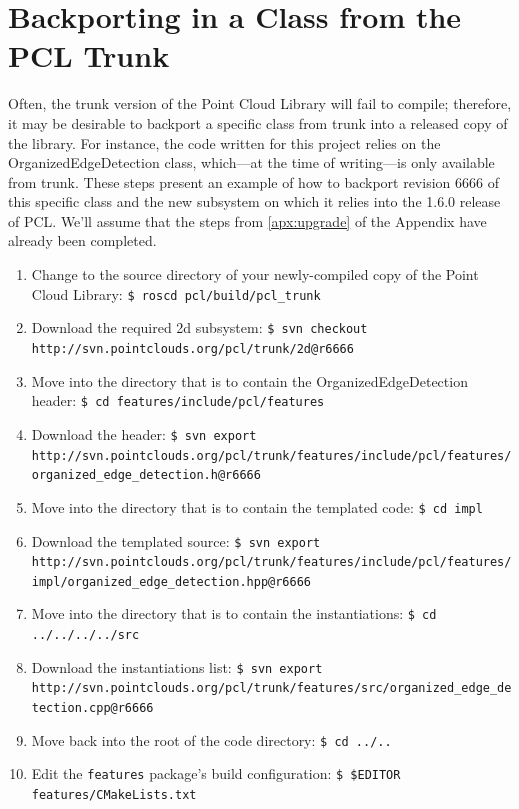 \documentclass[12pt]{report}
\begin{document}
\section{Backporting in a Class from the PCL Trunk}
Often, the trunk version of the Point Cloud Library will fail to compile; therefore, it may be desirable to backport a specific class from trunk into a released copy of the library.  For instance, the code written for this project relies on the OrganizedEdgeDetection class, which---at the time of writing---is only available from trunk.  These steps present an example of how to backport revision 6666 of this specific class and the new subsystem on which it relies into the 1.6.0 release of PCL.  We'll assume that the steps from \autoref{apx:upgrade} of the Appendix have already been completed.
\begin{sloppypar}
\begin{enumerate}
\item{Change to the source directory of your newly-compiled copy of the Point Cloud Library: \texttt{\$\ roscd pcl/build/pcl\_trunk}}
\item{Download the required 2d subsystem: \texttt{\$\ svn checkout http://svn.pointclouds.org/pcl/trunk/2d@r6666}}
\item{Move into the directory that is to contain the OrganizedEdgeDetection header: \texttt{\$\ cd features/include/pcl/features}}
\item{Download the header: \texttt{\$\ svn export http:\slash\slash svn.pointclouds.org\slash pcl\slash trunk\slash features\slash include\slash pcl\slash features\slash organized\_edge\_detection.h@r6666}}
\item{Move into the directory that is to contain the templated code: \texttt{\$\ cd impl}}
\item{Download the templated source: \texttt{\$\ svn export http:\slash\slash svn.pointclouds.org\slash pcl\slash trunk\slash features\slash include\slash pcl\slash features\slash impl\slash organized\_edge\_detection.hpp@r6666}}
\item{Move into the directory that is to contain the instantiations: \texttt{\$\ cd ../../../../src}}
\item{Download the instantiations list: \texttt{\$\ svn export http:\slash\slash svn.pointclouds.org\slash pcl\slash trunk\slash features\slash src\slash organized\_edge\_detection.cpp@r6666}}
\item{Move back into the root of the code directory: \texttt{\$\ cd ../..}}
\item{Edit the \texttt{features} package's build configuration: \texttt{\$\ \$EDITOR features/CMakeLists.txt}}

\end{enumerate}
\end{sloppypar}
\end{document}
